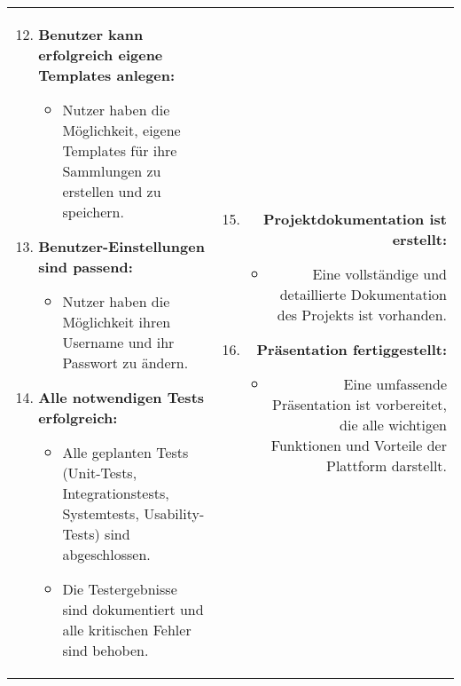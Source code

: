    \begin{tabularx}{\textwidth}{L R}
        \begin{enumerate}[left=0pt,label=\arabic*.,itemsep=0.4cm]
            \setcounter{enumi}{11}
            \small
            \item \textbf{Benutzer kann erfolgreich eigene Templates anlegen:}
            \begin{itemize}[leftmargin=*]
                \item Nutzer haben die Möglichkeit, eigene Templates für ihre Sammlungen zu erstellen und zu speichern.
            \end{itemize}

            \item \textbf{Benutzer-Einstellungen sind passend:}
            \begin{itemize}[leftmargin=*]
                \item Nutzer haben die Möglichkeit ihren Username und ihr Passwort zu ändern.
            \end{itemize}

            \item \textbf{Alle notwendigen Tests erfolgreich:}
            \begin{itemize}[leftmargin=*]
                \item Alle geplanten Tests (Unit-Tests, Integrationstests, Systemtests, Usability-Tests) sind abgeschlossen.
                \item Die Testergebnisse sind dokumentiert und alle kritischen Fehler sind behoben.
            \end{itemize}

        \end{enumerate}
        &
        \begin{enumerate}[left=0pt,label=\arabic*.,itemsep=0.4cm]
            \setcounter{enumi}{14}
            \small
            \item \textbf{Projektdokumentation ist erstellt:}
            \begin{itemize}[leftmargin=*]
                \item Eine vollständige und detaillierte Dokumentation des Projekts ist vorhanden.
            \end{itemize}

            \item \textbf{Präsentation fertiggestellt:}
            \begin{itemize}[leftmargin=*]
                \item Eine umfassende Präsentation ist vorbereitet, die alle wichtigen Funktionen und Vorteile der Plattform darstellt.
            \end{itemize}


\end{enumerate}
\end{tabularx}
